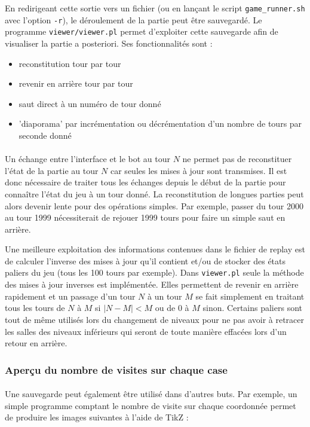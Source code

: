 \documentclass[a4paper,12pt]{article}
\begin{document}
En redirigeant cette sortie vers un fichier (ou en lançant le script
\verb!game_runner.sh! avec l'option \verb!-r!), le déroulement de la partie
peut être sauvegardé. Le programme \verb!viewer/viewer.pl! permet
d'exploiter cette sauvegarde afin de visualiser la partie a posteriori. Ses fonctionnalités sont :
\begin{itemize}
	\item reconstitution tour par tour
	\item revenir en arrière tour par tour
	\item saut direct à un numéro de tour donné
	\item 'diaporama' par incrémentation ou décrémentation d'un nombre de
		tours par seconde donné
\end{itemize}

\paragraph{}
Un échange entre l'interface et le bot au tour $N$ ne permet pas de
reconstituer l'état de la partie au tour $N$ car seules les mises à jour sont
transmises. Il est donc nécessaire de traiter tous les échanges depuis le
début de la partie pour connaître l'état du jeu à un tour donné. La
reconstitution de longues parties peut alors devenir lente pour des opérations
simples. Par exemple, passer du tour 2000 au tour 1999 nécessiterait de
rejouer 1999 tours pour faire un simple saut en arrière.

Une meilleure exploitation des informations contenues dans le fichier de
replay est de calculer l'inverse des mises à jour qu'il contient et/ou de
stocker des états paliers du jeu (tous les 100 tours par exemple). Dans
\verb!viewer.pl! seule la méthode des mises à jour inverses est implémentée.
Elles permettent de revenir en arrière rapidement et un passage d'un tour $N$
à un tour $M$ se fait simplement en traitant tous les tours de $N$ à $M$ si
$|N-M| < M$ ou de $0$ à $M$ sinon. Certains paliers sont tout de même utilisés
lors du changement de niveaux pour ne pas avoir à retracer les salles des
niveaux inférieurs qui seront de toute manière effacées lors d'un retour en
arrière.

\subsubsection{Aperçu du nombre de visites sur chaque case}

\paragraph{}
Une sauvegarde peut également être utilisé dans d'autres buts.
Par exemple, un simple programme comptant le nombre de visite sur chaque
coordonnée permet de produire les images suivantes à l'aide de TikZ :
\end{document}

